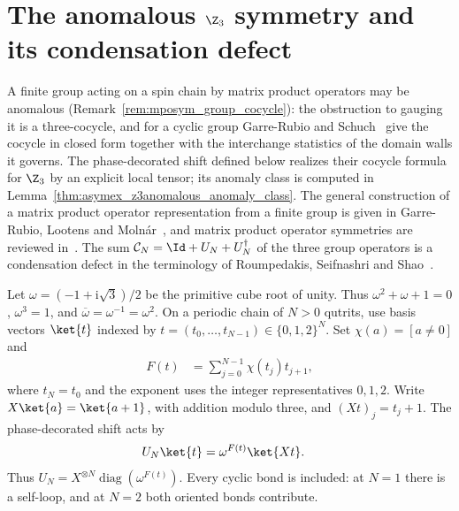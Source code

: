 
\section{The anomalous \texorpdfstring{$\Z_3$}{Z3} symmetry and its condensation defect}%
\label{sec:asymex_z3anomalous}

A finite group acting on a spin chain by matrix product operators may be
anomalous (Remark~\ref{rem:mposym_group_cocycle}): the obstruction to
gauging it is a three-cocycle, and for a
cyclic group Garre-Rubio and Schuch~\cite{GarreRubioSchuch2024DomainWall}
give the cocycle in closed form together with the interchange statistics
of the domain walls it governs.
The phase-decorated shift defined below realizes their cocycle formula for
$\Z_3$ by an explicit local tensor; its anomaly class is computed in
Lemma~\ref{thm:asymex_z3anomalous_anomaly_class}. The general construction of a matrix
product operator representation from a finite group is given in Garre-Rubio,
Lootens and Molnár~\cite{GarreRubio2023MPOSym}, and matrix product operator
symmetries are reviewed in~\cite[Section~III.A.6]{Cirac2021Matrix}. The sum
$\mathcal C_N = \Id + U_N + U_N^\dagger$ of the three group operators is a
condensation defect in the terminology of
Roumpedakis, Seifnashri and Shao~\cite{Roumpedakis2023Condensation}.

Let $\omega=(-1+\mathrm{i}\sqrt{3})/2$ be the primitive cube root of unity.
Thus $\omega^2+\omega+1=0$, $\omega^3=1$, and
$\overline{\omega}=\omega^{-1}=\omega^2$. On a periodic chain of $N>0$
qutrits, use basis vectors $\ket{t}$ indexed by
$t=(t_0,\ldots,t_{N-1})\in\{0,1,2\}^N$. Set $\chi(a)=[a\neq0]$ and
\begin{align}
    F(t) & =\sum_{j=0}^{N-1}\chi(t_j)t_{j+1},
    \label{eq:asymex_z3_phase}
\end{align}
where $t_N=t_0$ and the exponent uses the integer representatives
$0,1,2$. Write $X\ket{a}=\ket{a+1}$, with addition modulo three, and
$(Xt)_j=t_j+1$. The phase-decorated shift acts by
\begin{align}
    U_N\ket{t}
     & =\omega^{F(t)}\ket{Xt}.
    \label{eq:asymex_z3anomalous_operator}
\end{align}
Thus $U_N = X^{\otimes N}\operatorname{diag}(\omega^{F(t)})$. Every cyclic
bond is included: at $N=1$ there is a self-loop, and at $N=2$ both
oriented bonds contribute.

